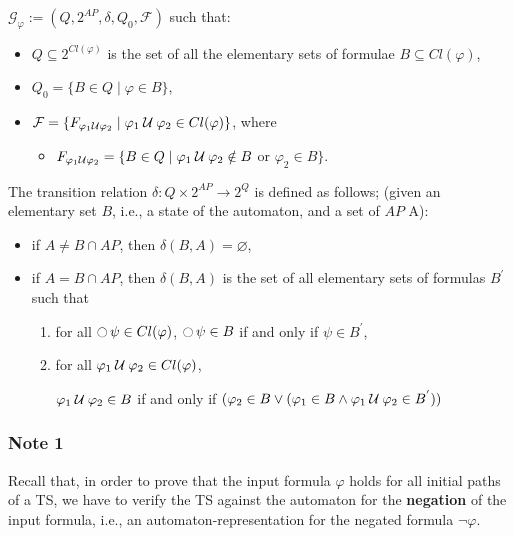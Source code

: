\documentclass{article}
\begin{document}
$\mathcal{G}_{\varphi} := (Q, 2^{AP}, \delta, Q_0, \mathcal{F})$ such that: 
\begin{itemize}
    \item $Q \subseteq 2^{Cl(\varphi)}$ is the set of all the elementary sets of formulae $B \subseteq Cl(\varphi)$,
    \item $Q_0 = \{ B \in Q \mid \varphi \in B\}$,
    \item $\mathcal{F} = \{ F_{\varphi_1 \mathbin{\mathcal{U}} \varphi_2} \mid \varphi_1 \mathbin{\mathcal{U}} \varphi_2 \in Cl(\varphi) \} $, where 
            \begin{itemize}
                \item $F_{\varphi_1 \mathbin{\mathcal{U}} \varphi_2} = \{ B \in Q \mid \varphi_1 \mathbin{\mathcal{U}} \varphi_2 \notin B$ or $\varphi_2 \in B \}$.
            \end{itemize}
\end{itemize}

The transition  relation $\delta : Q \times 2^{AP} \rightarrow 2^Q$ is defined as follows;
(given an elementary set $B$, i.e., a state of the automaton, and a set of $AP$ A):
\begin{itemize}
    \item if $A \neq B \cap AP$, then $\delta(B,A) = \varnothing$,
    \item if $A = B \cap AP$, then $\delta(B,A)$ is the set of all elementary sets of formulas $B^{'}$ such that 
            \begin{enumerate}
                \item for all $\mathop{\ocircle}{\psi} \in Cl(\varphi)$, $\mathop{\ocircle}{\psi} \in B$ if and only if $\psi \in B^{'}$,
                \item for all $\varphi_1 \mathbin{\mathcal{U}} \varphi_2 \in Cl(\varphi)$, 
                
                
                    \begin{center}
                        $\varphi_1 \mathbin{\mathcal{U}} \varphi_2 \in B$ if and only if $(\varphi_2 \in B \lor (\varphi_1 \in B \land \varphi_1 \mathbin{\mathcal{U}} \varphi_2 \in B^{'}))$
                    \end{center}
            \end{enumerate}
\end{itemize}




\subsubsection*{Note 1}
Recall that, in order to prove that the input formula $\varphi$ holds for all initial paths of a TS, we have 
to verify the TS against the automaton for the \textbf{negation} of the input formula, i.e., an automaton-representation 
for the negated formula $\neg \varphi$.
\end{document}
